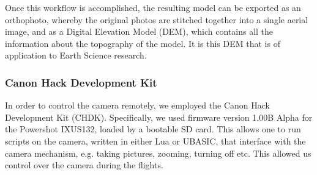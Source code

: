 Once this workflow is accomplished, the resulting model can be exported as an
orthophoto, whereby the original photos are stitched together into a single
aerial image, and as a Digital Elevation Model (DEM), which contains all the
information about the topography of the model. It is this DEM that is of
application to Earth Science research.

\subsubsection{Canon Hack Development Kit}

In order to control the camera remotely, we employed the Canon Hack Development
Kit (CHDK). Specifically, we used firmware
version 1.00B Alpha for the Powershot
IXUS132, loaded by a bootable SD
card. This allows one to run scripts on the camera, written in either Lua or
UBASIC, that interface with the camera mechanism, e.g. taking pictures, zooming,
turning off etc. This allowed us control over the camera during the flights.
